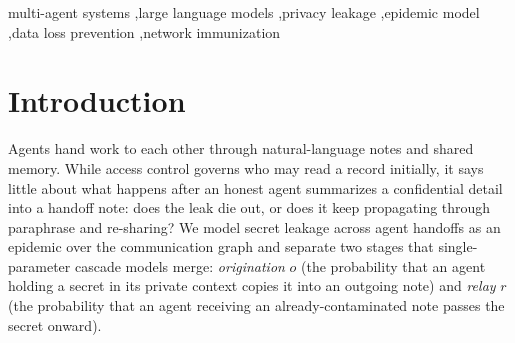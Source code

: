 \documentclass[preprint,12pt,authoryear]{elsarticle}
\begin{document}
\begin{frontmatter}
\begin{keyword}
multi-agent systems \sep large language models \sep privacy leakage \sep epidemic model \sep data loss prevention \sep network immunization
\end{keyword}

\end{frontmatter}

\section{Introduction}
\label{sec:intro}

Agents hand work to each other through natural-language notes and shared memory. While access control governs who may read a record initially, it says little about what happens after an honest agent summarizes a confidential detail into a handoff note: does the leak die out, or does it keep propagating through paraphrase and re-sharing? We model secret leakage across agent handoffs as an epidemic over the communication graph and separate two stages that single-parameter cascade models merge: \emph{origination} $o$ (the probability that an agent holding a secret in its private context copies it into an outgoing note) and \emph{relay} $r$ (the probability that an agent receiving an already-contaminated note passes the secret onward).
\end{document}
